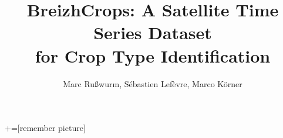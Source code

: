 \documentclass[a0]{tumposter}
\title{
	BreizhCrops: A Satellite Time Series Dataset \\ for Crop Type Identification
	}
\author{
	Marc Rußwurm\footnotemark[1],
	Sébastien Lefèvre\footnotemark[2],
	Marco Körner\footnotemark[1]
	}
\begin{document}
	
	
	+=[remember picture]
	
\maketitle


%
%
%

\end{document}
